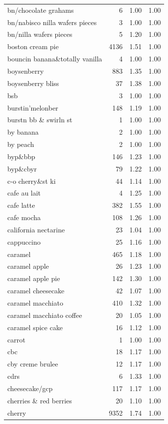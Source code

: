 \begin{table}
\begin{tabular}{lrrr}
bn/chocolate grahams & 6 & 1.00 & 1.00 \\
bn/nabisco nilla wafers pieces & 3 & 1.00 & 1.00 \\
bn/nilla wafers pieces & 5 & 1.20 & 1.00 \\
boston cream pie & 4136 & 1.51 & 1.00 \\
bouncin banana\&totally vanilla & 4 & 1.00 & 1.00 \\
boysenberry & 883 & 1.35 & 1.00 \\
boysenberry bliss & 37 & 1.38 & 1.00 \\
bsb & 3 & 1.00 & 1.00 \\
burstin'melonber & 148 & 1.19 & 1.00 \\
burstn bb \& swirln st & 1 & 1.00 & 1.00 \\
by banana & 2 & 1.00 & 1.00 \\
by peach & 2 & 1.00 & 1.00 \\
byp\&bbp & 146 & 1.23 & 1.00 \\
byp\&cbyr & 79 & 1.22 & 1.00 \\
c-o cherry\&st ki & 44 & 1.14 & 1.00 \\
cafe au lait & 4 & 1.25 & 1.00 \\
cafe latte & 382 & 1.55 & 1.00 \\
cafe mocha & 108 & 1.26 & 1.00 \\
california nectarine & 23 & 1.04 & 1.00 \\
cappuccino & 25 & 1.16 & 1.00 \\
caramel & 465 & 1.18 & 1.00 \\
caramel apple & 26 & 1.23 & 1.00 \\
caramel apple pie & 142 & 1.30 & 1.00 \\
caramel cheesecake & 42 & 1.07 & 1.00 \\
caramel macchiato & 410 & 1.32 & 1.00 \\
caramel macchiato coffee & 20 & 1.05 & 1.00 \\
caramel spice cake & 16 & 1.12 & 1.00 \\
carrot & 1 & 1.00 & 1.00 \\
cbc & 18 & 1.17 & 1.00 \\
cby creme brulee & 12 & 1.17 & 1.00 \\
cdrs & 6 & 1.33 & 1.00 \\
cheesecake/gcp & 117 & 1.17 & 1.00 \\
cherries \& red berries & 20 & 1.10 & 1.00 \\
cherry & 9352 & 1.74 & 1.00 \\

\end{tabular}
\end{table}
